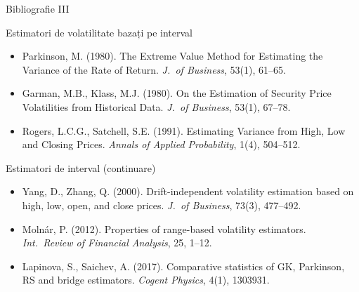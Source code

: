 \documentclass[9pt, aspectratio=169, t]{beamer}
\theoremstyle{definition}
\newenvironment{cminipage}[1]{%
    \par\noindent\hfill\begin{minipage}{#1}\ignorespaces
}{%
    \end{minipage}\hfill\null\par
}
\begin{document}
\begin{frame}{Bibliografie III}
    \vspace{-0.5cm}
    \begin{cminipage}{0.95\textwidth}
    \begin{block}{Estimatori de volatilitate bazați pe interval}
        {\footnotesize
        \begin{itemize}\setlength{\itemsep}{0pt}\setlength{\parsep}{0pt}\setlength{\topsep}{0pt}
            \item Parkinson, M. (1980). The Extreme Value Method for Estimating the Variance of the Rate of Return. \textit{J.\ of Business}, 53(1), 61--65.
            \item Garman, M.B., Klass, M.J. (1980). On the Estimation of Security Price Volatilities from Historical Data. \textit{J.\ of Business}, 53(1), 67--78.
            \item Rogers, L.C.G., Satchell, S.E. (1991). Estimating Variance from High, Low and Closing Prices. \textit{Annals of Applied Probability}, 1(4), 504--512.
        \end{itemize}
        }
    \end{block}

    \begin{exampleblock}{Estimatori de interval (continuare)}
        {\footnotesize
        \begin{itemize}\setlength{\itemsep}{0pt}\setlength{\parsep}{0pt}\setlength{\topsep}{0pt}
            \item Yang, D., Zhang, Q. (2000). Drift-independent volatility estimation based on high, low, open, and close prices. \textit{J.\ of Business}, 73(3), 477--492.
            \item Moln\'{a}r, P. (2012). Properties of range-based volatility estimators. \textit{Int.\ Review of Financial Analysis}, 25, 1--12.
            \item Lapinova, S., Saichev, A. (2017). Comparative statistics of GK, Parkinson, RS and bridge estimators. \textit{Cogent Physics}, 4(1), 1303931.
        \end{itemize}
        }
    \end{exampleblock}
    \end{cminipage}
\end{frame}
\end{document}
